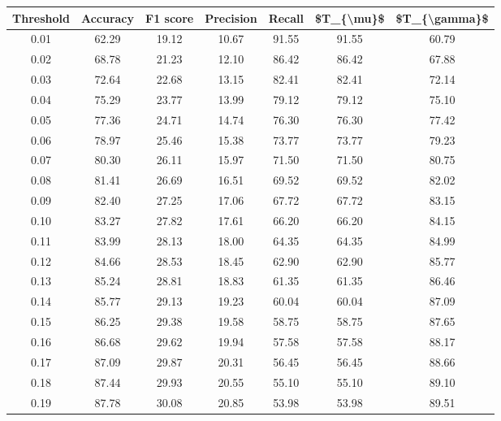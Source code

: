 \begin{tabular}{|c|c|c|c|c|c|c|}
\hline
 Threshold &  Accuracy &  F1 score &  Precision &  Recall &  \$T\_\{\textbackslash mu\}\$ &  \$T\_\{\textbackslash gamma\}\$ \\
\hline
      0.01 &     62.29 &     19.12 &      10.67 &   91.55 &      91.55 &         60.79 \\
      0.02 &     68.78 &     21.23 &      12.10 &   86.42 &      86.42 &         67.88 \\
      0.03 &     72.64 &     22.68 &      13.15 &   82.41 &      82.41 &         72.14 \\
      0.04 &     75.29 &     23.77 &      13.99 &   79.12 &      79.12 &         75.10 \\
      0.05 &     77.36 &     24.71 &      14.74 &   76.30 &      76.30 &         77.42 \\
      0.06 &     78.97 &     25.46 &      15.38 &   73.77 &      73.77 &         79.23 \\
      0.07 &     80.30 &     26.11 &      15.97 &   71.50 &      71.50 &         80.75 \\
      0.08 &     81.41 &     26.69 &      16.51 &   69.52 &      69.52 &         82.02 \\
      0.09 &     82.40 &     27.25 &      17.06 &   67.72 &      67.72 &         83.15 \\
      0.10 &     83.27 &     27.82 &      17.61 &   66.20 &      66.20 &         84.15 \\
      0.11 &     83.99 &     28.13 &      18.00 &   64.35 &      64.35 &         84.99 \\
      0.12 &     84.66 &     28.53 &      18.45 &   62.90 &      62.90 &         85.77 \\
      0.13 &     85.24 &     28.81 &      18.83 &   61.35 &      61.35 &         86.46 \\
      0.14 &     85.77 &     29.13 &      19.23 &   60.04 &      60.04 &         87.09 \\
      0.15 &     86.25 &     29.38 &      19.58 &   58.75 &      58.75 &         87.65 \\
      0.16 &     86.68 &     29.62 &      19.94 &   57.58 &      57.58 &         88.17 \\
      0.17 &     87.09 &     29.87 &      20.31 &   56.45 &      56.45 &         88.66 \\
      0.18 &     87.44 &     29.93 &      20.55 &   55.10 &      55.10 &         89.10 \\
      0.19 &     87.78 &     30.08 &      20.85 &   53.98 &      53.98 &         89.51 \\

\end{tabular}
